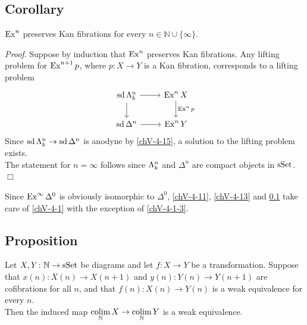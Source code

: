     \subsection{Corollary}\label{chV-4-16}
        $\operatorname{Ex}^n$ preserves Kan fibrations for every $n \in \mathbb{N} \cup \{\infty\}$.
        \smallskip

        \emph{Proof}. Suppose by induction that $\operatorname{Ex}^n$ preserves Kan fibrations. Any lifting problem for $\operatorname{Ex}^{n+1} p$, where $p \colon X \to Y$ is a Kan fibration, corresponds to a lifting problem
        \begin{equation*}
            \begin{tikzcd}
                \sd \horn{n}{k} \arrow[d] \arrow[r] & \Ex^n X \arrow[d, "\Ex^n p"] \\
                \sd \Delta^n \arrow[r] & \Ex^n Y
            \end{tikzcd}
        \end{equation*}
        Since $\operatorname{sd} \Lambda^{n}_{k} \to \operatorname{sd} \Delta^n$ is anodyne by \ref{chV-4-15}, a solution to the lifting problem exists.\\
        The statement for $n = \infty$ follows since $\Lambda^{n}_{k}$ and $\Delta^n$ are compact objects in $\operatorname{sSet}$.\hfill$\Box$
        \medskip

        Since $\operatorname{Ex}^{\infty} \Delta^0$ is obviously isomorphic to $\Delta^0$, \ref{chV-4-11}, \ref{chV-4-13} and \ref{chV-4-16} take care of \ref{chV-4-1} with the exception of \ref{chV-4-1-3}.

    \subsection{Proposition}\label{chV-4-17}
        Let $X, Y \colon \mathbb{N} \to \operatorname{sSet}$ be diagrams and let $f \colon X \to Y$ be a transformation. Suppose that $x(n) \colon X(n) \to X(n+1)$ and $y(n) \colon Y(n) \to Y(n+1)$ are cofibrations for all $n$, and that $f(n) \colon X(n) \to Y(n)$ is a weak equivalence for every $n$.\\
        Then the induced map $\operatorname*{colim}\limits_{\mathbb{N}} X \to \operatorname*{colim}\limits_{\mathbb{N}} Y$ is a weak equivalence.
        \smallskip

